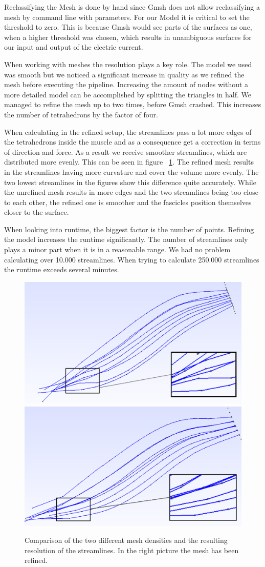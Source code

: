 \documentclass[preprint,journal]{vgtc}       %
\begin{document}
Reclassifying the Mesh is done by hand since Gmsh does not allow reclassifying a mesh by command line with parameters. 
For our Model it is critical to set the threshold to zero. 
This is because Gmsh would see parts of the surfaces as one, when a higher threshold was chosen, which results in unambiguous surfaces for our input and output of the electric current.

When working with meshes the resolution plays a key role. 
The model we used was smooth but we noticed a significant increase in quality as we refined the mesh before executing the pipeline. 
Increasing the amount of nodes without a more detailed model can be accomplished by splitting the triangles in half.
We managed to refine the mesh up to two times, before Gmsh crashed.
This increases the number of tetrahedrons by the factor of four. 

When calculating in the refined setup, the streamlines pass a lot more edges of the tetrahedrons inside the muscle and as a consequence get a correction in terms of direction and force. 
As a result we receive smoother streamlines, which are distributed more evenly. 
This can be seen in figure ~\ref{fig:refStreamlines}.
The refined mesh results in the streamlines having more curvature and cover the volume more evenly.
The two lowest streamlines in the figures show this difference quite accurately.
While the unrefined mesh results in more edges and the two streamlines being too close to each other, the refined one is smoother and the fascicles position themselves closer to the surface.

When looking into runtime, the biggest factor is the number of points.
Refining the model increases the runtime significantly. 
The number of streamlines only plays a minor part when it is in a reasonable range.
We had no problem calculating over 10.000 streamlines. When trying to calculate 250.000 streamlines the runtime exceeds several minutes.

\begin{figure}
	\begin{minipage}{\linewidth}
		\includegraphics[width=.5\linewidth]{Streamlines_zoom.PNG}
		\includegraphics[width=.51\linewidth]{refStreamlines_zoom.PNG}
		\caption{Comparison of the two different mesh densities and the resulting resolution of the streamlines. In the right picture the mesh has been refined.}
		\label{fig:refStreamlines}
	\end{minipage}
\end{figure}
\end{document}
